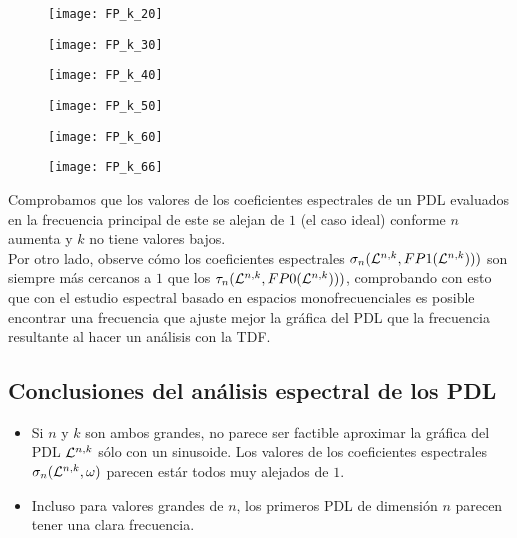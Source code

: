 \begin{figure}[H]
	\centering
	\texttt{[image: FP\_k\_20]} 
\end{figure}	

\begin{figure}[H]
	\centering
	\texttt{[image: FP\_k\_30]} 
\end{figure}	

\begin{figure}[H]
	\centering
	\texttt{[image: FP\_k\_40]} 
\end{figure}	

\begin{figure}[H]
	\centering
	\texttt{[image: FP\_k\_50]} 
\end{figure}	

\begin{figure}[H]
	\centering
	\texttt{[image: FP\_k\_60]} 
\end{figure}	

\begin{figure}[H]
	\centering
	\texttt{[image: FP\_k\_66]} 
\end{figure}	


Comprobamos que los valores de los
coeficientes espectrales de un PDL
evaluados en la frecuencia principal de este 
se alejan de $1$ (el caso ideal)
conforme $n$ aumenta y $k$ no tiene valores bajos. \\

Por otro lado, 
observe cómo los coeficientes espectrales 
$\sigma_{n}(\mathcal{L}^{n,k}, FP1(\mathcal{L}^{n,k})))$ son 
siempre más cercanos a $1$
que los 
$\tau_{n}(\mathcal{L}^{n,k}, FP0(\mathcal{L}^{n,k})))$, 
comprobando con esto que con el estudio
espectral basado en espacios monofrecuenciales
es posible encontrar una frecuencia que ajuste mejor la
gráfica del PDL que la frecuencia resultante
al hacer un análisis con la TDF.

\subsection{Conclusiones del análisis espectral de los PDL}
\begin{itemize}
\item Si $n$ y $k$ son ambos grandes, 
no parece ser factible aproximar la gráfica
del PDL $\mathcal{L}^{n,k}$ sólo con un sinusoide. Los valores
de los coeficientes espectrales $\sigma_{n}(\mathcal{L}^{n,k}, \omega)$
parecen estár todos muy alejados de $1$.
\item Incluso para valores grandes de $n$, los primeros
PDL de dimensión $n$ parecen tener una clara frecuencia.
\end{itemize}
